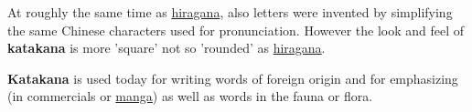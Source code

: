 

At roughly the same time as \hyperref[sec:Hiragana]{hiragana}, also
 letters were invented by
simplifying the same Chinese characters used for pronunciation. However the
look and feel of \textbf{katakana} is more 'square' not so 'rounded' as
\hyperref[sec:Hiragana]{hiragana}.

\textbf{Katakana} is used today for writing words of foreign origin and for
emphasizing (in commercials or \hyperref[sec:Manga]{manga}) as well as words in
the fauna or flora.


